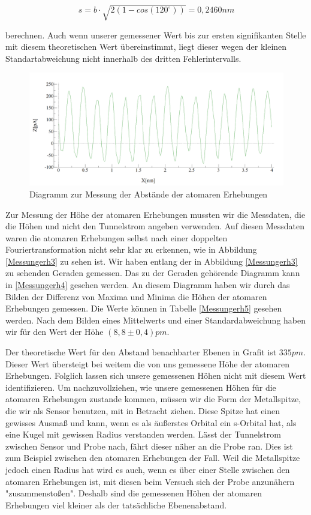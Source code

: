 \documentclass[10pt,a4paper]{article}
\begin{document}
\begin{equation}
	s = b \cdot \sqrt{2(1-cos(120^\circ))} = 0,2460 nm
\end{equation}

berechnen. Auch wenn unserer gemessener Wert bis zur ersten signifikanten Stelle mit diesem theoretischen Wert übereinstimmt, liegt dieser wegen der kleinen Standartabweichung nicht innerhalb des dritten Fehlerintervalls.

\begin{figure}[h]
	\centering
	
	\includegraphics[scale = 0.3]{Aufnahme_Ebene_doppelte_fourier.png}
	
	\caption{Diagramm zur Messung der Abstände der atomaren Erhebungen}
	\label{Messungerh2}
\end{figure}

Zur Messung der Höhe der atomaren Erhebungen mussten wir die Messdaten, die die Höhen und nicht den Tunnelstrom angeben verwenden. Auf diesen Messdaten waren die atomaren Erhebungen selbst nach einer doppelten Fouriertransformation nicht sehr klar zu erkennen, wie in Abbildung \ref{Messungerh3} zu sehen ist. Wir haben entlang der in Abbildung \ref{Messungerh3} zu sehenden Geraden gemessen. Das zu der Geraden gehörende Diagramm kann in \ref{Messungerh4} gesehen werden. An diesem Diagramm haben wir durch das Bilden der Differenz von Maxima und Minima die Höhen der atomaren Erhebungen gemessen. Die Werte können in Tabelle \ref{Messungerh5} gesehen werden. Nach dem Bilden eines Mittelwerts und einer Standardabweichung haben wir für den Wert der Höhe $(8,8 \pm 0,4) pm$.

Der theoretische Wert für den Abstand benachbarter Ebenen in Grafit ist $335 pm$. Dieser Wert übersteigt bei weitem die von uns gemessene Höhe der atomaren Erhebungen. Folglich lassen sich unsere gemessenen Höhen nicht mit diesem Wert identifizieren. Um nachzuvollziehen, wie unsere gemessenen Höhen für die atomaren Erhebungen zustande kommen, müssen wir die Form der Metallspitze, die wir als Sensor benutzen, mit in Betracht ziehen. Diese Spitze hat einen gewisses Ausmaß und kann, wenn es als äußerstes Orbital ein s-Orbital hat, als eine Kugel mit gewissen Radius verstanden werden. Lässt der Tunnelstrom zwischen Sensor und Probe nach, fährt dieser näher an die Probe ran. Dies ist zum Beispiel zwischen den atomaren Erhebungen der Fall. Weil die Metallspitze jedoch einen Radius hat wird es auch, wenn es über einer Stelle zwischen den atomaren Erhebungen ist, mit diesen beim Versuch sich der Probe anzunähern "zusammenstoßen". Deshalb sind die gemessenen Höhen der atomaren Erhebungen viel kleiner als der tatsächliche Ebenenabstand.
\end{document}

